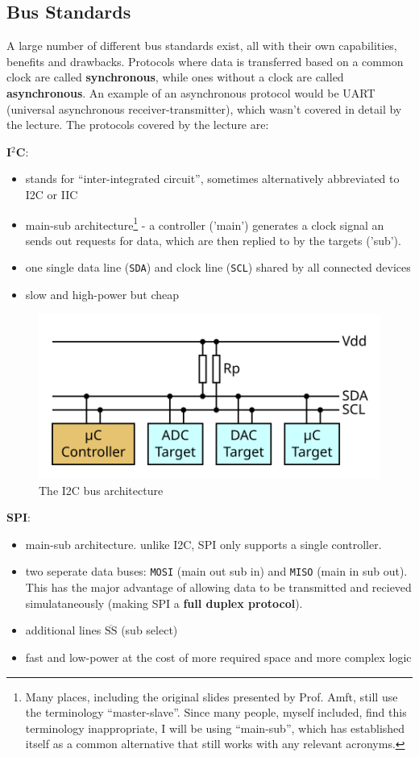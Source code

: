 \documentclass{report}
\newcommand{\tbf}{\textbf}
\newcommand*{\newpar}{\par\vspace{\baselineskip}\noindent} %
\begin{document}
\subsection{Bus Standards}
A large number of different bus standards exist, all with their own capabilities, benefits and drawbacks. Protocols where data is transferred based on a common clock are called \tbf{synchronous}, while ones without a clock are called \tbf{asynchronous}. An example of an asynchronous protocol would be UART (universal asynchronous receiver-transmitter), which wasn't covered in detail by the lecture. The protocols covered by the lecture are:
\newpar
\tbf{I$^2$C}:
\begin{itemize}
 \item stands for ``inter-integrated circuit'', sometimes alternatively abbreviated to I2C or IIC
 \item main-sub architecture\footnote{
 Many places, including the original slides presented by Prof. Amft, still use the terminology ``master-slave''. Since many people, myself included, find this terminology inappropriate, I will be using ``main-sub'', which has established itself as a common alternative that still works with any relevant acronyms.}
 - a controller ('main') generates a clock signal an sends out requests for data, which are then replied to by the targets ('sub').
 \item one single data line (\texttt{SDA}) and clock line (\texttt{SCL}) shared by all connected devices
 \item slow and high-power but cheap
\end{itemize}
\begin{figure}[h!]
\centering
\includegraphics[scale=0.5]{figures/I2C.png}
\caption{The I2C bus architecture}
\label{fig:DeltaPWM}
\end{figure}
\tbf{SPI}:
\begin{itemize}
 \item main-sub architecture. unlike I2C, SPI only supports a single controller.
 \item two seperate data buses: \texttt{MOSI} (main out sub in) and \texttt{MISO} (main in sub out). This has the major advantage of allowing data to be transmitted and recieved simulataneously (making SPI a \tbf{full duplex protocol}).
 \item additional lines $\overline{\text{SS}}$ (sub select)
 \item fast and low-power at the cost of more required space and more complex logic
\end{itemize}
\end{document}
